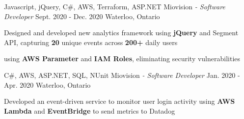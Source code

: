 \begin{siderules}
  \begin{cventries}
    \cventry
    {Javascript, jQuery, C\#, AWS, Terraform, ASP.NET}
    {Miovision\hspace{0.15em} \bodyfontlight\itshape{- Software Developer}}
    {Sept. 2020 - Dec. 2020}
    {Waterloo, Ontario}
    {
      \begin{cvitems}
        \item {Designed and developed new analytics framework using \textbf{jQuery} and Segment API, capturing \textbf{20} unique events across \textbf{200+} daily users}
        \item {using \textbf{AWS Parameter} and \textbf{IAM Roles}, eliminating security vulnerabilities }
      \end{cvitems}
    }
    \cventry
    {C\#, AWS, ASP.NET, SQL, NUnit}
    {Miovision\hspace{0.15em} \bodyfontlight\itshape{- Software Developer}}
    {Jan. 2020 - Apr. 2020}
    {Waterloo, Ontario}
    {
      \begin{cvitems}
        \item {Developed an event-driven service to monitor user login activity using \textbf{AWS Lambda} and \textbf{EventBridge} to send metrics to Datadog}
        \item {}

\end{cvitems}}
\end{cventries}
\end{siderules}
